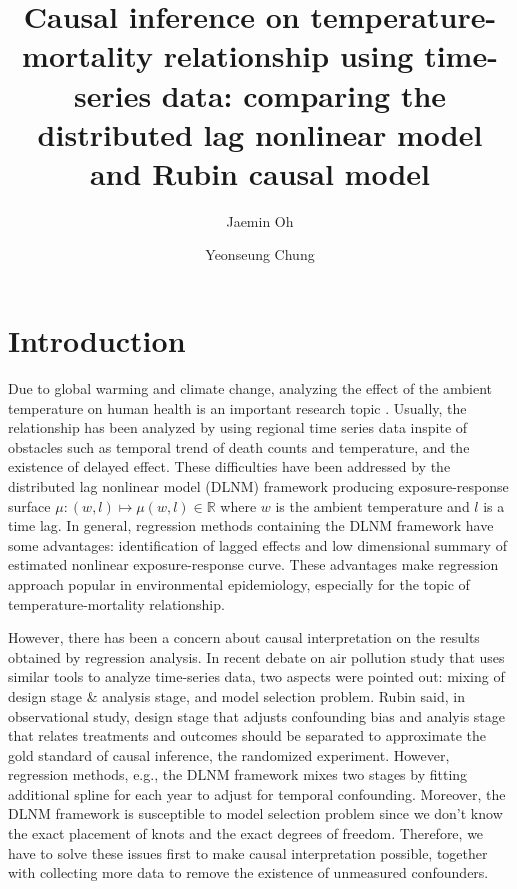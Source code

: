 \documentclass[12pt]{article}
\author[1]{Jaemin Oh}
\author[2]{Yeonseung Chung}
\affil[1,2]{Department of Mathematical Sciences, 
KAIST, Daejeon, South Korea}
\title{
	Causal inference on temperature-mortality relationship using time-series data: 
	comparing the distributed lag nonlinear model and Rubin causal model
	} %
\begin{document}
\maketitle



\section{Introduction}

Due to global warming and climate change,
analyzing the effect of the ambient temperature on human health is an important research topic
\cite{gasparrini2017, yoonhee2019}.
Usually, the relationship has been analyzed by using regional time series data
inspite of obstacles such as 
temporal trend of death counts and temperature, and the existence of delayed effect.
These difficulties have been addressed by 
the distributed lag nonlinear model (DLNM) framework\cite{dlnm2010}
producing exposure-response surface
$\mu : (w, l) \mapsto \mu(w,l) \in \mathbb{R}$ where $w$ is the ambient temperature and $l$ is a time lag.
In general, regression methods containing the DLNM framework have some advantages:
identification of lagged effects and
low dimensional summary of estimated nonlinear exposure-response curve.
These advantages make regression approach popular in environmental epidemiology,
especially for the topic of temperature-mortality relationship.

However, there has been a concern about causal interpretation 
on the results obtained by regression analysis.
In recent debate on air pollution study\cite{dominici2019sci} 
that uses similar tools to analyze time-series data,
two aspects were pointed out:
mixing of design stage \& analysis stage, and model selection problem.
Rubin said, in observational study,
design stage that adjusts confounding bias and analyis stage that relates treatments and outcomes
should be separated to approximate the gold standard of causal inference, 
the randomized experiment\cite{rubin2007sim}.
However, regression methods, e.g., the DLNM framework mixes two stages
by fitting additional spline for each year to adjust for temporal confounding.
Moreover, the DLNM framework is susceptible to model selection problem\cite{gasparrini2016}
since we don't know the exact placement of knots and the exact degrees of freedom.
Therefore, we have to solve these issues first to make causal interpretation possible,
together with collecting more data to remove the existence of unmeasured confounders.
\end{document}
